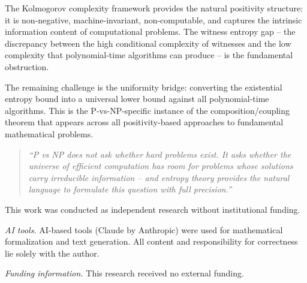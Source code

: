 \documentclass[aps,prd,twocolumn,superscriptaddress,nofootinbib]{revtex4-2}
\theoremstyle{definition}
\theoremstyle{remark}
\begin{document}
The Kolmogorov complexity framework provides the natural positivity structure: it is non-negative, machine-invariant, non-computable, and captures the intrinsic information content of computational problems. The witness entropy gap -- the discrepancy between the high conditional complexity of witnesses and the low complexity that polynomial-time algorithms can produce -- is the fundamental obstruction.

The remaining challenge is the uniformity bridge: converting the existential entropy bound into a universal lower bound against all polynomial-time algorithms. This is the P-vs-NP-specific instance of the composition/coupling theorem that appears across all positivity-based approaches to fundamental mathematical problems.

\begin{quote}
\textit{``P vs NP does not ask whether hard problems exist. It asks whether the universe of efficient computation has room for problems whose solutions carry irreducible information -- and entropy theory provides the natural language to formulate this question with full precision.''}
\end{quote}


\begin{acknowledgments}
This work was conducted as independent research without institutional funding.

\textit{AI tools.} AI-based tools (Claude by Anthropic) were used for mathematical formalization and text generation. All content and responsibility for correctness lie solely with the author.

\textit{Funding information.} This research received no external funding.
\end{acknowledgments}
\end{document}
